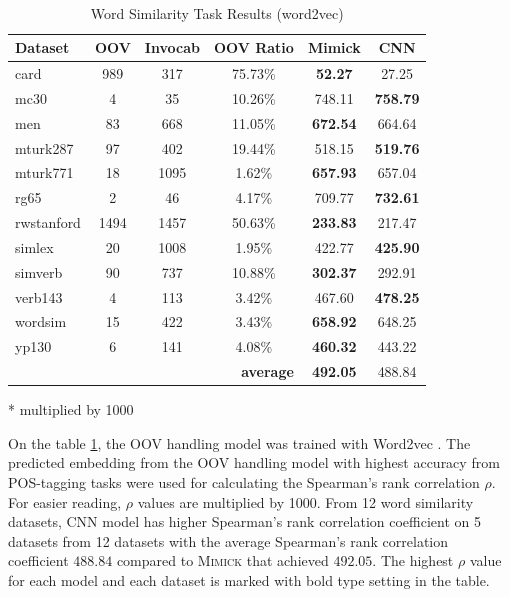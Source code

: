     \begin{table}[!ht]
      \begin{threeparttable} 
      \begin{center}
        \caption{Word Similarity Task Results (word2vec)}
        ~\\
        \label{tab:wordsim:word2vec}
        \begin{tabular}{l|c|c|c|c|c}
          \textbf{Dataset} & \textbf{OOV} & \textbf{Invocab} & \textbf{OOV Ratio} & \textbf{Mimick}\tnote{*} & \textbf{CNN}\tnote{*}\\
          \hline
          card & 989 & 317 & 75.73\% & \textbf{52.27} & 27.25\\
          mc30 & 4 & 35 & 10.26\% & 748.11 & \textbf{758.79}\\
          men & 83 & 668 & 11.05\% & \textbf{672.54} & 664.64\\
          mturk287 & 97 & 402 & 19.44\% & 518.15 & \textbf{519.76}\\
          mturk771 & 18 & 1095 & 1.62\% & \textbf{657.93} & 657.04\\
          rg65 & 2 & 46 & 4.17\% & 709.77 & \textbf{732.61}\\
          rwstanford & 1494 & 1457 & 50.63\% & \textbf{233.83} & 217.47\\
          simlex & 20 & 1008 & 1.95\% & 422.77 & \textbf{425.90}\\
          simverb & 90 & 737 & 10.88\% & \textbf{302.37} & 292.91\\
          verb143 & 4 & 113 & 3.42\% & 467.60 & \textbf{478.25}\\
          wordsim & 15 & 422 & 3.43\% & \textbf{658.92} & 648.25\\
          yp130 & 6 & 141 & 4.08\% & \textbf{460.32} & 443.22\\
          \hline
          \multicolumn{4}{r|}{\textbf{average}} & \textbf{492.05} & 488.84\\
        \end{tabular}
        \begin{tablenotes}
          \item[*] multiplied by 1000
        \end{tablenotes}
      \end{center}
      
    \end{threeparttable} 
    \end{table}
    On the table \ref{tab:wordsim:word2vec}, the OOV handling model
    was trained with Word2vec \citep{Distributed2013mikolov}. The
    predicted embedding from the OOV handling model with highest
    accuracy from POS-tagging tasks were used for calculating the
    Spearman's rank correlation $\rho$. For easier reading, $\rho$
    values are multiplied by 1000. From 12 word similarity datasets,
    CNN model has higher Spearman's rank correlation coefficient on 5
    datasets from 12 datasets with the average Spearman's rank
    correlation coefficient $488.84$ compared to \textsc{Mimick}
    that achieved $492.05$. The highest $\rho$ value for each model
    and each dataset is marked with bold type setting in the table.

